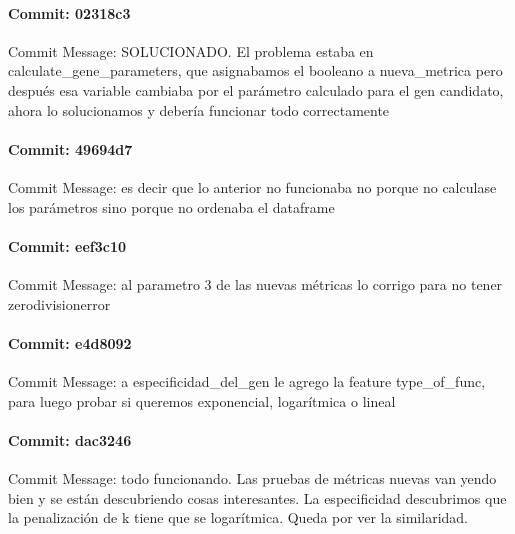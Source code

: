 \documentclass{article}
\begin{document}
\paragraph{Commit: 02318c3}
Commit Message: SOLUCIONADO. El problema estaba en calculate_gene_parameters, que asignabamos el booleano a nueva_metrica pero después esa variable cambiaba por el parámetro calculado para el gen candidato, ahora lo solucionamos y debería funcionar todo correctamente

\paragraph{Commit: 49694d7}
Commit Message: es decir que lo anterior no funcionaba no porque no calculase los parámetros sino porque no ordenaba el dataframe

\paragraph{Commit: eef3c10}
Commit Message: al parametro 3 de las nuevas métricas lo corrigo para no tener zerodivisionerror

\paragraph{Commit: e4d8092}
Commit Message: a especificidad_del_gen le agrego la feature type_of_func, para luego probar si queremos exponencial, logarítmica o lineal

\paragraph{Commit: dac3246}
Commit Message: todo funcionando. Las pruebas de métricas nuevas van yendo bien y se están descubriendo cosas interesantes. La especificidad descubrimos que la penalización de k tiene que se logarítmica. Queda por ver la similaridad.

\end{document}
